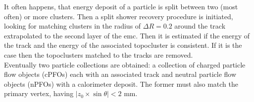   	  It often happens, that energy deposit of a particle is split between two (most often) or more clusters. Then a split shower recovery procedure is initiated, looking for matching clusters in the radius of $\Delta R = 0.2$ around the track extrapolated to the second layer of the \gls{emc}. Then it is estimated if the energy of the track and the energy of the associated topocluster is consistent. If it is the case then the topoclusters matched to the tracks are removed. \\
  	  Eventually two particle collections are obtained: a collection of charged particle flow objects (cPFOs) each with an associated track and neutral particle flow objects (nPFOs) with a calorimeter deposit. The former must also match the primary vertex, having $|z_0\times \sin{\theta}| < 2$ mm.